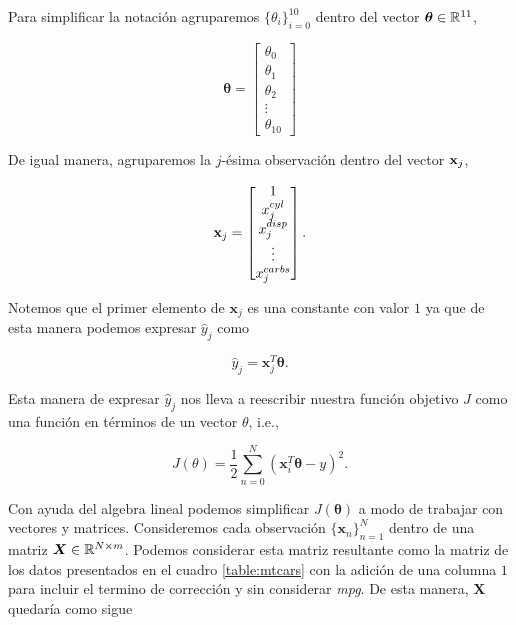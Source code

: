 \documentclass[11pt]{article}
\begin{document}
 
 Para simplificar la notación agruparemos $\{\theta_i\}_{i=0}^{10}$ dentro del vector $\bm{\theta} \in \mathbb{R}^{11}$, 
 
\begin{equation}
	\bm\theta = \begin{bmatrix}
	    \theta_0 \\
	    \theta_1 \\
	    \theta_2 \\
	    \vdots \\
	    \theta_{10}
	 \end{bmatrix}
\end{equation}

De igual manera, agruparemos la $j$-ésima observación dentro del vector $\bold{x}_j$,

\begin{equation}
\bold{x}_{j} = \begin{bmatrix}
            1 \\
            x^{cyl}_j \\
            x^{disp}_j \\
            \vdots \\
            x^{carbs}_j 
         \end{bmatrix}.
\end{equation}

Notemos que el primer elemento de $\bm{x}_j$ es una constante con valor $1$ ya que de esta manera podemos expresar $\hat y_j$ como

\begin{equation}
	\hat y_j = \bm{x}_j^T\bm\theta.
\end{equation}

Esta manera de expresar $\hat y_j$ nos lleva a reescribir nuestra función objetivo $J$ como una función en términos de un vector $\theta$, i.e.,

\begin{equation}
  J(\theta) = \frac{1}{2}\sum_{n=0}^N(\bm{x}_i^T\bm\theta - y)^2.
\end{equation}

Con ayuda del algebra lineal podemos simplificar $J(\bm\theta)$ a modo de trabajar con vectores y matrices. Consideremos cada observación $\{\bm{x}_n\}_{n=1}^N$ dentro de una matriz $\bm X\in\mathbb{R}^{N\times m}$. Podemos considerar esta matriz resultante como la matriz de los datos presentados en el cuadro \ref{table:mtcars} con la adición de una columna $1$ para incluir el termino de corrección y sin considerar \textit{mpg}. De esta manera, $\bm X$ quedaría como sigue
\end{document}
